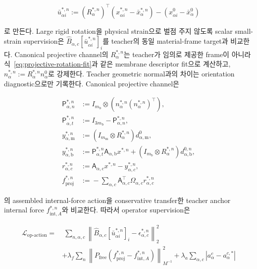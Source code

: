 \documentclass[11pt,a4paper]{article}
\begin{document}
\begin{equation}
  \bar u_{\alpha i}^{*,n}
  :=
  (R_\alpha^{*,n})^\top
  (x_{\alpha i}^{*,n}-\bar x_\alpha^{*,n})
  -(x_{\alpha i}^0-\bar x_\alpha^0)
\end{equation}

로 만든다. Large rigid rotation을 physical strain으로 벌점 주지 않도록 scalar small-strain
supervision은 \(\widehat B_{\alpha,c}
[\bar u_{\alpha i}^{*,n}]_i\)를 teacher의 동일 material-frame target과 비교한다.
Canonical projective channel의 \(R_\alpha^{*,n}\)는 teacher가 임의로 제공한 frame이 아니라
식~\eqref{eq:projective-rotation-fit}과 같은 membrane descriptor fit으로 계산하고,
\(n_\alpha^{*,n}:=R_\alpha^{*,n}n_\alpha^0\)로 강제한다.
Teacher geometric normal과의 차이는 orientation diagnostic으로만 기록한다.
Canonical projective channel은

\begin{equation}
\begin{aligned}
  \mathsf P_{\alpha,n}^{*,n}
  &:={}I_{m_{\mathrm b}}\otimes
  (n_\alpha^{*,n}(n_\alpha^{*,n})^\top),\\
  \mathsf P_{\alpha,t}^{*,n}
  &:={}I_{3m_{\mathrm b}}-\mathsf P_{\alpha,n}^{*,n},\\
  y_{\alpha,\mathrm m}^{*,n}
  &:={}(I_{m_{\mathrm m}}\otimes R_\alpha^{*,n})d_{\alpha,\mathrm m}^0,\\
  y_{\alpha,\mathrm b}^{*,n}
  &:={}\mathsf P_{\alpha,t}^{*,n}\mathsf A_{\alpha,\mathrm b}x^{*,n}
  +(I_{m_{\mathrm b}}\otimes R_\alpha^{*,n})d_{\alpha,\mathrm b}^{0,n},\\
  r_{\alpha,c}^{*,n}
  &:={}\mathsf A_{\alpha,c}x^{*,n}-y_{\alpha,c}^{*,n},\\
  f_{\mathrm{proj}}^{*,n}
  &:={}-\sum_{\alpha,c}\mathsf A_{\alpha,c}^\top
  \Omega_{\alpha,c}r_{\alpha,c}^{*,n}
\end{aligned}
\end{equation}

의 assembled internal-force action을 conservative transfer한 teacher anchor internal force
\(f_{\mathrm{int},A}^{*,n}\)와 비교한다. 따라서 operator supervision은

\begin{equation}
\begin{aligned}
  \mathcal L_{\mathrm{op\mbox{-}action}}
  =&\;
  \sum_{n,\alpha,c}
  \left\|
  \widehat B_{\alpha,c}[\bar u_{\alpha i}^{*,n}]_i
  -\epsilon_{\alpha,c}^{*,n}
  \right\|_2^2\\
  &+\lambda_f\sum_n
  \left\|
  P_{\mathrm{free}}
  (f_{\mathrm{proj}}^{*,n}-f_{\mathrm{int},A}^{*,n})
  \right\|_{M^{-1}}^2
  +\lambda_a\sum_{\alpha,c}
  \left|a_\alpha^c-a_\alpha^{c,*}\right|
  \label{eq:operator-geometry-loss}
\end{aligned}
\end{equation}
\end{document}
